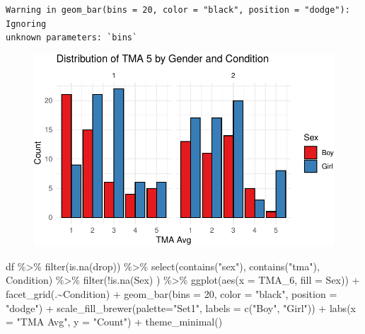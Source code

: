 \documentclass[
  letterpaper,
  DIV=11,
  numbers=noendperiod]{scrartcl}
\newenvironment{Shaded}{\begin{snugshade}}{\end{snugshade}}
\newcommand{\AttributeTok}[1]{\textcolor[rgb]{0.40,0.45,0.13}{#1}}
\newcommand{\DecValTok}[1]{\textcolor[rgb]{0.68,0.00,0.00}{#1}}
\newcommand{\FunctionTok}[1]{\textcolor[rgb]{0.28,0.35,0.67}{#1}}
\newcommand{\NormalTok}[1]{\textcolor[rgb]{0.00,0.23,0.31}{#1}}
\newcommand{\SpecialCharTok}[1]{\textcolor[rgb]{0.37,0.37,0.37}{#1}}
\newcommand{\StringTok}[1]{\textcolor[rgb]{0.13,0.47,0.30}{#1}}
\begin{document}
\begin{verbatim}
Warning in geom_bar(bins = 20, color = "black", position = "dodge"): Ignoring
unknown parameters: `bins`
\end{verbatim}

\begin{figure}[H]

{\centering \includegraphics{mathAnx_eda1_files/figure-pdf/unnamed-chunk-5-1.pdf}

}

\end{figure}

\begin{Shaded}
\begin{Highlighting}[]
\NormalTok{df }\SpecialCharTok{\%\textgreater{}\%}  \FunctionTok{filter}\NormalTok{(}\FunctionTok{is.na}\NormalTok{(drop)) }\SpecialCharTok{\%\textgreater{}\%} 
  \FunctionTok{select}\NormalTok{(}\FunctionTok{contains}\NormalTok{(}\StringTok{"sex"}\NormalTok{), }\FunctionTok{contains}\NormalTok{(}\StringTok{"tma"}\NormalTok{), Condition) }\SpecialCharTok{\%\textgreater{}\%} 
  \FunctionTok{filter}\NormalTok{(}\SpecialCharTok{!}\FunctionTok{is.na}\NormalTok{(Sex) ) }\SpecialCharTok{\%\textgreater{}\%} 
  \FunctionTok{ggplot}\NormalTok{(}\FunctionTok{aes}\NormalTok{(}\AttributeTok{x =}\NormalTok{ TMA\_6, }\AttributeTok{fill =}\NormalTok{ Sex)) }\SpecialCharTok{+}
  \FunctionTok{facet\_grid}\NormalTok{(.}\SpecialCharTok{\textasciitilde{}}\NormalTok{Condition) }\SpecialCharTok{+}
  \FunctionTok{geom\_bar}\NormalTok{(}\AttributeTok{bins =} \DecValTok{20}\NormalTok{, }\AttributeTok{color =} \StringTok{"black"}\NormalTok{,}
           \AttributeTok{position =} \StringTok{"dodge"}\NormalTok{) }\SpecialCharTok{+}
  \FunctionTok{scale\_fill\_brewer}\NormalTok{(}\AttributeTok{palette=}\StringTok{"Set1"}\NormalTok{, }\AttributeTok{labels =} 
                      \FunctionTok{c}\NormalTok{(}\StringTok{"Boy"}\NormalTok{, }\StringTok{"Girl"}\NormalTok{)) }\SpecialCharTok{+}
  \FunctionTok{labs}\NormalTok{(}\AttributeTok{x =} \StringTok{"TMA Avg"}\NormalTok{, }\AttributeTok{y =} \StringTok{"Count"}\NormalTok{) }\SpecialCharTok{+}
  \FunctionTok{theme\_minimal}\NormalTok{() }
\end{Highlighting}
\end{Shaded}
\end{document}
